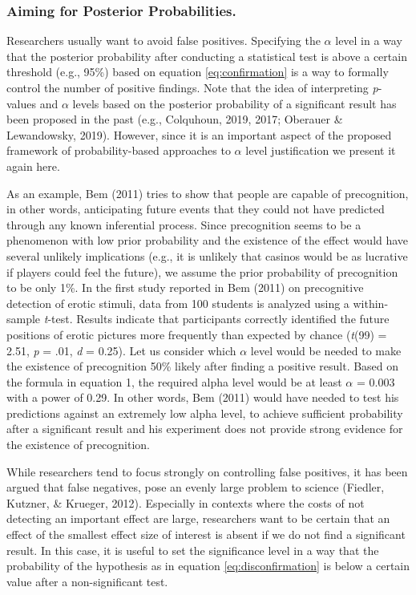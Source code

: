 \documentclass[
  english,
  ,jou,floatsintext]{apa6}
\begin{document}
\hypertarget{aiming-for-posterior-probabilities.}{%
\subsubsection{Aiming for Posterior Probabilities.}\label{aiming-for-posterior-probabilities.}}

Researchers usually want to avoid false positives. Specifying the \(\alpha\) level in a way that the posterior probability after conducting a statistical test is above a certain threshold (e.g., 95\%) based on equation \ref{eq:confirmation} is a way to formally control the number of positive findings. Note that the idea of interpreting \emph{p}-values and \(\alpha\) levels based on the posterior probability of a significant result has been proposed in the past (e.g., Colquhoun, 2019, 2017; Oberauer \& Lewandowsky, 2019). However, since it is an important aspect of the proposed framework of probability-based approaches to \(\alpha\) level justification we present it again here.

As an example, Bem (2011) tries to show that people are capable of precognition, in other words, anticipating future events that they could not have predicted through any known inferential process. Since precognition seems to be a phenomenon with low prior probability and the existence of the effect would have several unlikely implications (e.g., it is unlikely that casinos would be as lucrative if players could feel the future), we assume the prior probability of precognition to be only 1\%. In the first study reported in Bem (2011) on precognitive detection of erotic stimuli, data from 100 students is analyzed using a within-sample \emph{t}-test. Results indicate that participants correctly identified the future positions of erotic pictures more frequently than expected by chance (\emph{t}(99) = 2.51, \emph{p} = .01, \emph{d} = 0.25).
Let us consider which \(\alpha\) level would be needed to make the existence of precognition 50\% likely after finding a positive result.
Based on the formula in equation 1, the required alpha level would be at least \(\alpha\) = 0.003 with a power of 0.29. In other words, Bem (2011) would have needed to test his predictions against an extremely low alpha level, to achieve sufficient probability after a significant result and his experiment does not provide strong evidence for the existence of precognition.

While researchers tend to focus strongly on controlling false positives, it has been argued that false negatives, pose an evenly large problem to science (Fiedler, Kutzner, \& Krueger, 2012). Especially in contexts where the costs of not detecting an important effect are large, researchers want to be certain that an effect of the smallest effect size of interest is absent if we do not find a significant result. In this case, it is useful to set the significance level in a way that the probability of the hypothesis as in equation \ref{eq:disconfirmation} is below a certain value after a non-significant test.
\end{document}

